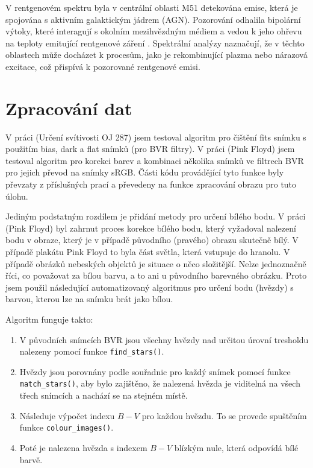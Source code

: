 \documentclass[a4paper,11pt,twocolumn]{article}
\begin{document}
            V rentgenovém spektru byla v centrální oblasti M51 detekována emise, která je spojována s aktivním galaktickým jádrem (AGN). Pozorování odhalila bipolární výtoky, které interagují s okolním mezihvězdným médiem a vedou k jeho ohřevu na teploty emitující rentgenové záření \citet{liu2015}. Spektrální analýzy naznačují, že v těchto oblastech může docházet k procesům, jako je rekombinující plazma nebo nárazová excitace, což přispívá k pozorované rentgenové emisi.
        
    \section{Zpracování dat}
        V práci (Určení svítivosti OJ 287) jsem testoval algoritm pro čištění fits snímku s použitím bias, dark a flat snímků (pro BVR filtry). V práci (Pink Floyd) jsem testoval algoritm pro korekci barev a kombinaci několika snímků ve filtrech BVR pro jejich převod na snímky sRGB. Části kódu provádějící tyto funkce byly převzaty z příslušných prací a převedeny na funkce zpracování obrazu pro tuto úlohu. 

        Jediným podstatným rozdílem je přidání metody pro určení bílého bodu. V práci (Pink Floyd) byl zahrnut proces korekce bílého bodu, který vyžadoval nalezení bodu v obraze, který je v případě původního (pravého) obrazu skutečně bílý. V případě plakátu Pink Floyd to byla část světla, která vstupuje do hranolu. V případě obrázků nebeských objektů je situace o něco složitější. Nelze jednoznačně říci, co považovat za bílou barvu, a to ani u původního barevného obrázku. Proto jsem použil následující automatizovaný algoritmus pro určení bodu (hvězdy) s barvou, kterou lze na snímku brát jako bílou. 

        Algoritm funguje takto: 

        \begin{enumerate}
            \item V původních snímcích BVR jsou všechny hvězdy nad určitou úrovní tresholdu nalezeny pomocí funkce \texttt{find\_stars()}.
            \item Hvězdy jsou porovnány podle souřadnic pro každý snímek pomocí funkce \texttt{match\_stars()}, aby bylo zajištěno, že nalezená hvězda je viditelná na všech třech snímcích a nachází se na stejném místě.
            \item Následuje výpočet indexu $B-V$ pro každou hvězdu. To se provede spuštěním funkce \texttt{colour\_images()}. 
            \item Poté je nalezena hvězda s indexem $B-V$ blízkým nule, která odpovídá bílé barvě. 
        \end{enumerate}
\end{document}
